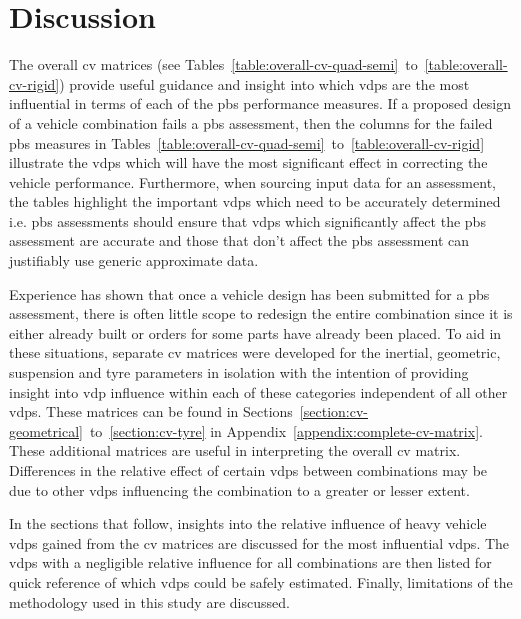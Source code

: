 \chapter{Discussion}\label{chapter:discussion}

The overall \gls{cv} matrices (see Tables~\ref{table:overall-cv-quad-semi}~to~\ref{table:overall-cv-rigid}) provide useful guidance and insight into which \glspl{vdp} are the most influential in terms of each of the \gls{pbs} performance measures. If a proposed design of a vehicle combination fails a \gls{pbs} assessment, then the columns for the failed \gls{pbs} measures in Tables~\ref{table:overall-cv-quad-semi}~to~\ref{table:overall-cv-rigid} illustrate the \glspl{vdp} which will have the most significant effect in correcting the vehicle performance. Furthermore, when sourcing input data for an assessment, the tables highlight the important \glspl{vdp} which need to be accurately determined i.e. \gls{pbs} assessments should ensure that \glspl{vdp} which significantly affect the \gls{pbs} assessment are accurate and those that don't affect the \gls{pbs} assessment can justifiably use generic approximate data.

Experience has shown that once a vehicle design has been submitted for a \gls{pbs} assessment, there is often little scope to redesign the entire combination since it is either already built or orders for some parts have already been placed. To aid in these situations, separate \gls{cv} matrices were developed for the inertial, geometric, suspension and tyre parameters in isolation with the intention of providing insight into \gls{vdp} influence within each of these categories independent of all other \glspl{vdp}. These matrices can be found in Sections~\ref{section:cv-geometrical}~to~\ref{section:cv-tyre} in Appendix~\ref{appendix:complete-cv-matrix}. These additional matrices are useful in interpreting the overall \gls{cv} matrix. Differences in the relative effect of certain \glspl{vdp} between combinations may be due to other \glspl{vdp} influencing the combination to a greater or lesser extent.

In the sections that follow, insights into the relative influence of heavy vehicle \glspl{vdp} gained from the \gls{cv} matrices are discussed for the most influential \glspl{vdp}. The \glspl{vdp} with a negligible relative influence for all combinations are then listed for quick reference of which \glspl{vdp} could be safely estimated. Finally, limitations of the methodology used in this study are discussed.

